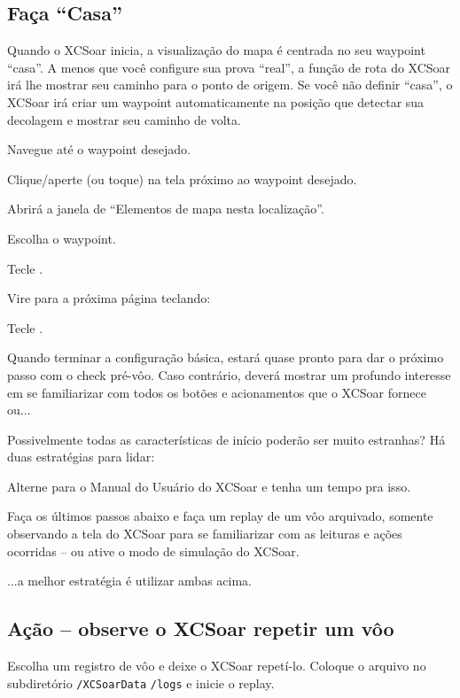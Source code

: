 \documentclass[a4paper,12pt]{refrep}
\begin{document}
\subsection{\textcolor{flashblue}{Faça ``Casa''}}
Quando o XCSoar inicia, a visualização do mapa é centrada no seu waypoint “casa”.  A menos que você configure sua prova “real”, a função de rota do XCSoar irá lhe mostrar seu caminho para o ponto de origem.  Se você não definir “casa”, o XCSoar irá criar um waypoint automaticamente na posição que detectar sua decolagem e mostrar seu caminho de volta.
\begin{compactitem}
\item Navegue até o waypoint desejado.
\item Clique/aperte (ou toque) na tela próximo ao waypoint desejado.
\item Abrirá a janela de “Elementos de mapa nesta localização”.
\item Escolha o waypoint.
\item Tecle .
\item Vire para a próxima página teclando: \blink
\item Tecle .
\end{compactitem}

Quando terminar a configuração básica, estará quase pronto para dar o próximo passo com o check pré-vôo.  Caso contrário, deverá mostrar um profundo interesse em se familiarizar com todos os botões e acionamentos que o XCSoar fornece ou...

Possivelmente todas as características de início poderão ser muito estranhas?  Há duas estratégias para lidar:


\begin{compactitem}
\item Alterne para o Manual do Usuário do XCSoar e tenha um tempo pra isso.
\item Faça os últimos passos abaixo e faça um replay de um vôo arquivado, somente observando a tela do XCSoar para se familiarizar com as leituras e ações ocorridas – ou ative o modo de simulação do XCSoar.
\end{compactitem}

...a melhor estratégia é utilizar ambas acima.

\subsection{\textcolor{flashblue}{Ação – observe o XCSoar repetir um vôo}}
Escolha um registro de vôo e deixe o XCSoar repetí-lo.  Coloque o arquivo no subdiretório \verb+/XCSoarData+ \verb+/logs+ e inicie o replay.
\end{document}
